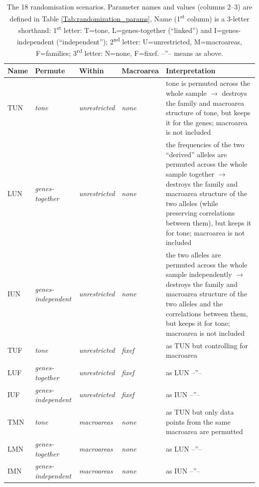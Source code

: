 \documentclass[twoside,twocolumn]{article}
\begin{document}
\begin{table}[h]
  \caption{The 18 randomisation scenarios. Parameter names and values (columns 2--3) are defined in Table \ref{Tab:randomization_params}, Name (1\textsuperscript{st} column) is a 3-letter shorthand: 1\textsuperscript{st} letter: T=tone, L=genes-together (``linked'') and I=genes-independent (``independent''); 2\textsuperscript{nd} letter: U=unrestricted, M=macroareas, F=families; 3\textsuperscript{rd} letter: N=none, F=fixef. --''-- means as above.}
  \label{Tab:randomization_scenarios}
  \centering
  \begin{tabularx}{\textwidth}{|l|l|l|l|X|}
    \toprule
    \textbf{Name} & \textbf{Permute} & \textbf{Within} & \textbf{Macroarea} & \textbf{Interpretation} \\
    \midrule
    TUN & \textit{tone} & \textit{unrestricted} & \textit{none} & tone is permuted across the whole sample $\rightarrow$ destroys the family and macroarea structure of tone, but keeps it for the genes; macroarea is not included \\
    \midrule
    LUN & \textit{genes-together} & \textit{unrestricted} & \textit{none} & the frequencies of the two ``derived'' alleles are permuted across the whole sample together $\rightarrow$ destroys the family and macroarea structure of the two alleles (while preserving correlations between them), but keeps it for tone; macroarea is not included \\
    \midrule
    IUN & \textit{genes-independent} & \textit{unrestricted} & \textit{none} & the two alleles are permuted across the whole sample independently $\rightarrow$ destroys the family and macroarea structure of the two alleles and the correlations between them, but keeps it for tone; macroarea is not included \\
    \midrule
    TUF & \textit{tone} & \textit{unrestricted} & \textit{fixef} & as TUN but controlling for macroarea \\
    LUF & \textit{genes-together} & \textit{unrestricted} & \textit{fixef} & as LUN --''-- \\
    IUF & \textit{genes-independent} & \textit{unrestricted} & \textit{fixef} & as IUN --''-- \\
    \midrule
    TMN & \textit{tone} & \textit{macroareas} & \textit{none} & as TUN but only data points from the same macroarea are permutted \\
    LMN & \textit{genes-together} & \textit{macroareas} & \textit{none} & as LUN --''-- \\
    IMN & \textit{genes-independent} & \textit{macroareas} & \textit{none} & as IUN --''-- \\

\end{tabularx}
\end{table}
\end{document}
